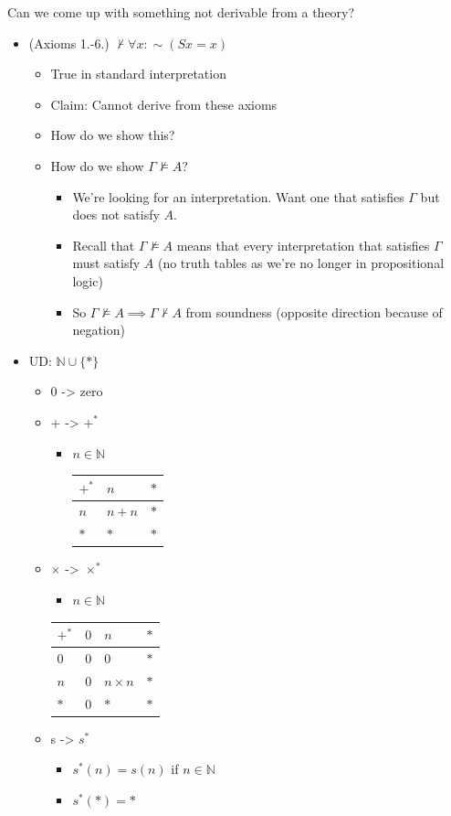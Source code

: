 \documentclass[11pt]{article}
\begin{document}
Can we come up with something not derivable from a theory?
\begin{itemize}
\item (Axioms 1.-6.) \(\nvdash \forall x: \sim(Sx = x)\)
\begin{itemize}
\item True in standard interpretation
\item Claim: Cannot derive from these axioms
\item How do we show this?
\item How do we show \(\Gamma \nvDash A\)?
\begin{itemize}
\item We're looking for an interpretation. Want one that satisfies \(\Gamma\) but does not satisfy \(A\).
\item Recall that \(\Gamma \nvDash A\) means that every interpretation that satisfies \(\Gamma\) must satisfy \(A\) (no truth tables as we're no longer in propositional logic)
\item So \(\Gamma \nvDash A \implies \Gamma \nvdash A\) from soundness (opposite direction because of negation)
\end{itemize}
\end{itemize}
\item UD: \(\mathbb{N}\cup \{*\}\)
\begin{itemize}
\item 0 -> zero
\item + -> \(+^*\)
\begin{itemize}
\item \(n \in \mathbb{N}\)

\begin{tabular}{l|l l}
  $+^*$ & $n$ & $*$
  \\ \hline $n$ & $n+n$ & $*$
  \\ $*$ & $*$ & $*$
\end{tabular}
\end{itemize}

\item \(\times\) -> \(\times^*\)
\begin{itemize}
\item \(n \in \mathbb{N}\)
\end{itemize}
\begin{tabular}{l|l l l}
    $+^*$ & $0$ & $n$ & $*$
    \\ \hline $0$ & $0$ & $0$ & $*$
    \\ $n$ & $0$ & $n \times n$ & $*$
    \\ $*$ & $0$ & $*$ & $*$
\end{tabular}
\item s -> \(s^*\)
\begin{itemize}
\item \(s^*(n) = s(n)\) if \(n\in \mathbb{N}\)
\item \(s^*(*) = *\)
\end{itemize}
\end{itemize}
\end{itemize}
\end{document}

